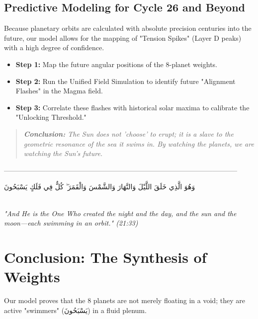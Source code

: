 \documentclass[11pt]{article}
\begin{document}
\subsection*{Predictive Modeling for Cycle 26 and Beyond}
Because planetary orbits are calculated with absolute precision centuries into the future, our model allows for the mapping of "Tension Spikes" (Layer D peaks) with a high degree of confidence. 
\begin{itemize}
    \item \textbf{Step 1:} Map the future angular positions of the 8-planet weights.
    \item \textbf{Step 2:} Run the Unified Field Simulation to identify future "Alignment Flashes" in the Magma field.
    \item \textbf{Step 3:} Correlate these flashes with historical solar maxima to calibrate the "Unlocking Threshold."
\end{itemize}



\begin{quote}
\textit{\textbf{Conclusion:} The Sun does not 'choose' to erupt; it is a slave to the geometric resonance of the sea it swims in. By watching the planets, we are watching the Sun’s future.}
\end{quote}

\------------------------------------------------------------------------------------------------------
    \begin{center}
        \Large 
        \begin{otherlanguage}{arabic}
            وَهُوَ الَّذِي خَلَقَ اللَّيْلَ وَالنَّهَارَ وَالشَّمْسَ وَالْقَمَرَ ۖ كُلٌّ فِي فَلَكٍ يَسْبَحُونَ
        \end{otherlanguage} \\
        \vspace{10pt}
        \small \textit{"And He is the One Who created the night and the day, and the sun and the moon—each swimming in an orbit." (21:33)}
    \end{center}

    \hrulefill 

    \section*{Conclusion: The Synthesis of Weights}
    Our model proves that the 8 planets are not merely floating in a void; they are active "swimmers" (\foreignlanguage{arabic}{يَسْبَحُونَ}) in a fluid plenum. 
\end{document}
